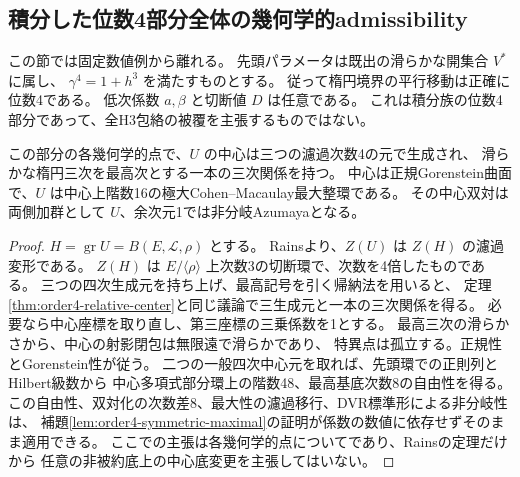 \subsection{積分した位数4部分全体の幾何学的admissibility}
\label{subsec:order4-general-criterion}
この節では固定数値例から離れる。
先頭パラメータは既出の滑らかな開集合 $V^*$ に属し、
$\gamma^4=1+h^3$ を満たすものとする。
従って楕円境界の平行移動は正確に位数4である。
低次係数 $a,\beta$ と切断値 $D$ は任意である。
これは積分族の位数4部分であって、全H3包絡の被覆を主張するものではない。

\begin{lemma}[全係数での中心と対称最大整環]
\label{lem:order4-general-center-order}
この部分の各幾何学的点で、$U$ の中心は三つの濾過次数4の元で生成され、
滑らかな楕円三次を最高次とする一本の三次関係を持つ。
中心は正規Gorenstein曲面で、$U$ は中心上階数16の極大Cohen--Macaulay最大整環である。
その中心双対は両側加群として $U$、余次元1では非分岐Azumayaとなる。
\end{lemma}
\begin{proof}
$H=\operatorname{gr}U=B(E,\mathcal L,\rho)$ とする。
Rains\cite[Theorem 2.13]{RainsCut}より、$Z(U)$ は $Z(H)$ の濾過変形である。
$Z(H)$ は $E/\langle\rho\rangle$ 上次数3の切断環で、次数を4倍したものである。
三つの四次生成元を持ち上げ、最高記号を引く帰納法を用いると、
定理\ref{thm:order4-relative-center}と同じ議論で三生成元と一本の三次関係を得る。
必要なら中心座標を取り直し、第三座標の三乗係数を1とする。
最高三次の滑らかさから、中心の射影閉包は無限遠で滑らかであり、
特異点は孤立する。正規性とGorenstein性が従う。
二つの一般四次中心元を取れば、先頭環での正則列とHilbert級数から
中心多項式部分環上の階数48、最高基底次数8の自由性を得る。
この自由性、双対化の次数差8、最大性の濾過移行、DVR標準形による非分岐性は、
補題\ref{lem:order4-symmetric-maximal}の証明が係数の数値に依存せずそのまま適用できる。
ここでの主張は各幾何学的点についてであり、Rainsの定理だけから
任意の非被約底上の中心底変更を主張してはいない。
\end{proof}

